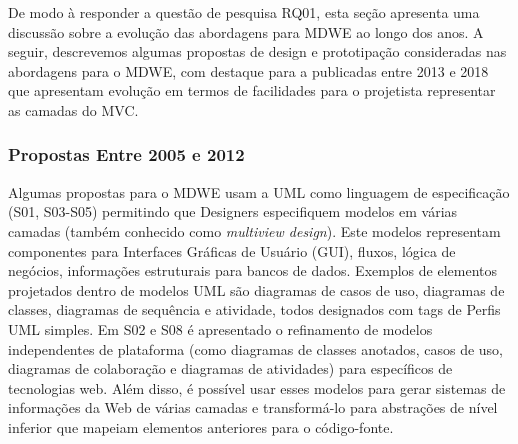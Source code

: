 De modo à responder a questão de pesquisa RQ01, esta seção apresenta uma discussão sobre a evolução das abordagens para MDWE ao longo dos anos. A seguir, descrevemos algumas propostas de design e prototipação consideradas nas abordagens para o MDWE, com destaque para a publicadas entre 2013 e 2018 que apresentam evolução em termos de facilidades para o projetista representar as camadas do MVC.

\subsubsection{Propostas Entre 2005 e 2012}

Algumas propostas para o MDWE usam a UML como linguagem de especificação (S01, S03-S05) permitindo que Designers especifiquem modelos em várias camadas (também conhecido como \textit{multiview design}). Este modelos representam componentes para Interfaces Gráficas de Usuário (GUI), fluxos, lógica de negócios, informações estruturais para bancos de dados. Exemplos de elementos projetados dentro de modelos UML são diagramas de casos de uso, diagramas de classes, diagramas de sequência e atividade, todos designados com tags de Perfis UML simples. Em S02 e S08 é apresentado o refinamento de modelos independentes de plataforma (como diagramas de classes anotados, casos de uso, diagramas de colaboração e diagramas de atividades) para específicos de tecnologias web. Além disso, é possível usar esses modelos para gerar sistemas de informações da Web de várias camadas e transformá-lo para abstrações de nível inferior que mapeiam elementos anteriores para o código-fonte.




